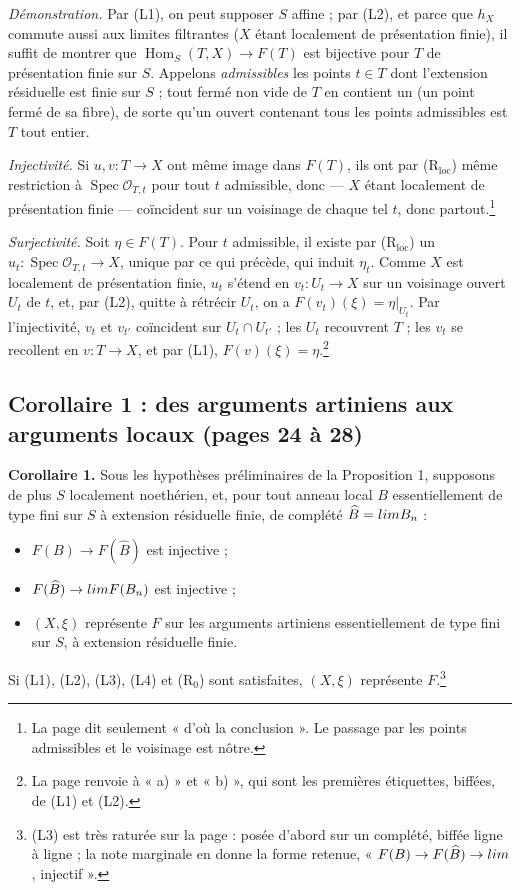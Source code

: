 \documentclass[11pt,a4paper]{article}
\begin{document}
\emph{Démonstration.} Par (L1), on peut supposer $S$ affine ; par (L2), et
parce que $h_X$ commute aussi aux limites filtrantes ($X$ étant localement de
présentation finie), il suffit de montrer que $\operatorname{Hom}_S(T, X) \to
F(T)$ est bijective pour $T$ de présentation finie sur $S$. Appelons
\emph{admissibles} les points $t \in T$ dont l'extension résiduelle est finie
sur $S$ ; tout fermé non vide de $T$ en contient un (un point fermé de sa
fibre), de sorte qu'un ouvert contenant tous les points admissibles est
$T$ tout entier.

\emph{Injectivité.} Si $u, v : T \to X$ ont même image dans $F(T)$, ils ont
par (R$_{\mathrm{loc}}$) même restriction à $\operatorname{Spec}
\mathcal{O}_{T,t}$ pour tout $t$ admissible, donc — $X$ étant localement de
présentation finie — coïncident sur un voisinage de chaque tel $t$, donc
partout.\footnote{La page dit seulement « d'où la conclusion ». Le passage
par les points admissibles et le voisinage est nôtre.}

\emph{Surjectivité.} Soit $\eta \in F(T)$. Pour $t$ admissible, il existe par
(R$_{\mathrm{loc}}$) un $u_t : \operatorname{Spec} \mathcal{O}_{T,t} \to X$,
unique par ce qui précède, qui induit $\eta_t$. Comme $X$ est localement de
présentation finie, $u_t$ s'étend en $v_t : U_t \to X$ sur un voisinage
ouvert $U_t$ de $t$, et, par (L2), quitte à rétrécir $U_t$, on a
$F(v_t)(\xi) = \eta|_{U_t}$. Par l'injectivité, $v_t$ et $v_{t'}$ coïncident
sur $U_t \cap U_{t'}$ ; les $U_t$ recouvrent $T$ ; les $v_t$ se recollent en
$v : T \to X$, et par (L1), $F(v)(\xi) = \eta$.\footnote{La page renvoie à
« a) » et « b) », qui sont les premières étiquettes, biffées, de (L1) et
(L2).}

\subsection*{Corollaire 1 : des arguments artiniens aux arguments locaux (pages 24 à 28)}

\textbf{Corollaire 1.} Sous les hypothèses préliminaires de la Proposition 1,
supposons de plus $S$ localement noethérien, et, pour tout anneau local $B$
essentiellement de type fini sur $S$ à extension résiduelle finie, de
complété $\widehat{B} = \varprojlim B_n$ :
\begin{itemize}
\item[(L3)] $F(B) \to F(\widehat{B})$ est injective ;
\item[(L4)] $F(\widehat{B}) \to \varprojlim F(B_n)$ est injective ;
\item[(R$_0$)] $(X, \xi)$ représente $F$ sur les arguments artiniens
essentiellement de type fini sur $S$, à extension résiduelle finie.
\end{itemize}
Si (L1), (L2), (L3), (L4) et (R$_0$) sont satisfaites, $(X, \xi)$ représente
$F$.\footnote{(L3) est très raturée sur la page : posée d'abord sur un
complété, biffée ligne à ligne ; la note marginale en donne la forme retenue,
« $F(B) \to F(\widehat{B}) \to \varprojlim$, injectif ».}
\end{document}
